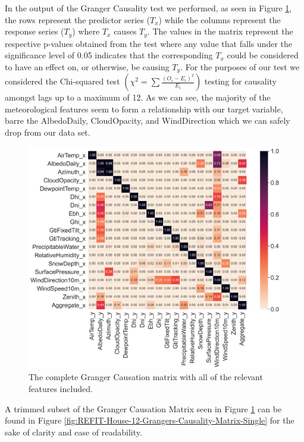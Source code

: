 \noindent In the output of the Granger Causality test we performed, as seen in Figure \ref{fig:REFIT-House-12-Grangers-Causality-Matrix-All}, the rows represent the predictor series ($T_x$) while the columns represent the response series ($T_y$) where $T_x$ causes $T_y$. The values in the matrix represent the respective p-values obtained from the test where any value that falls under the significance level of 0.05 indicates that the corresponding $T_x$ could be considered to have an effect on, or otherwise, be causing $T_y$. For the purposes of our test we considered the Chi-squared test $\left(\chi^2 = \sum \frac{(O_i - E_i)^2}{E_i}\right)$ testing for causality amongst lags up to a maximum of 12. As we can see, the majority of the meteorological features seem to form a relationship with our target variable, barre the AlbedoDaily, CloudOpacity,  and WindDirection which we can safely drop from our data set.

\begin{figure}[H]
    \centering
    \includegraphics[width=\textwidth]{Images/Chapter 5/REFIT/REFIT-House-12-Grangers-Causality-Matrix.png}
    \caption{The complete Granger Causation matrix with all of the relevant features included.}
    \label{fig:REFIT-House-12-Grangers-Causality-Matrix-All}
\end{figure}

\noindent A trimmed subset of the Granger Causation Matrix seen in Figure \ref{fig:REFIT-House-12-Grangers-Causality-Matrix-All} can be found in Figure \ref{fig:REFIT-House-12-Grangers-Causality-Matrix-Single} for the sake of clarity and ease of readability.

